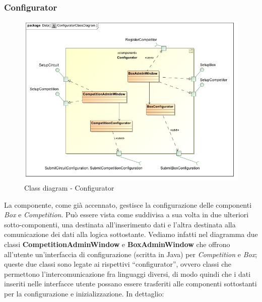 \subsubsection{Configurator}
\begin{center}
\begin{figure}[h!]
	\includegraphics[scale=0.50]{img/ClassDiagrams/ConfiguratorClassDiagram.jpg}
\caption{Class diagram - Configurator}
\end{figure}
\end{center}
La componente, come gi\`{a} accennato, gestisce la configurazione delle componenti \emph{Box} e \emph{Competition}. Pu\`{o} essere vista come suddivisa
a sua volta in due ulteriori sotto-componenti, una destinata all'inserimento dati e l'altra destinata alla comunicazione dei dati alla logica
sottostante. Vediamo infatti nel diagramma due classi \textbf{CompetitionAdminWindow} e \textbf{BoxAdminWindow} che offrono all'utente
un'interfaccia di configurazione (scritta in Java) per \emph{Competition} e \emph{Box}; queste due classi sono legate ai rispettivi ``configurator'',
ovvero classi che permettono l'intercomunicazione fra linguaggi diversi, di modo quindi che i dati inseriti nelle interfacce utente
possano essere trasferiti alle componenti sottostanti per la configurazione e inizializzazione. In dettaglio:
